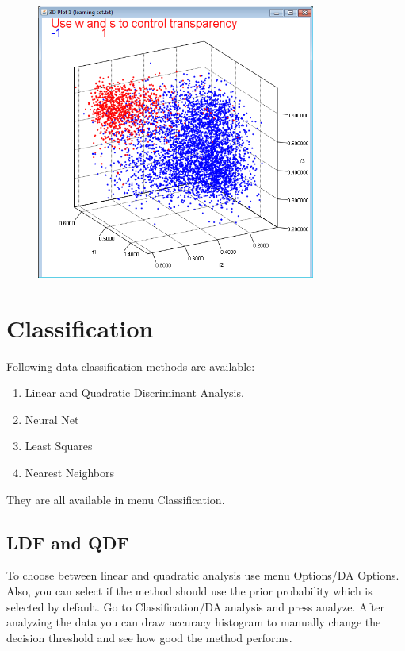 \documentclass[a4paper,12pt,english]{report}
\begin{document}
\begin{figure}[htb]
\centering
\includegraphics[width=260pt]{s10.png}
\end{figure}

\newpage

\section*{Classification}
Following data classification methods are available:
\begin{enumerate}
\item	Linear and Quadratic Discriminant Analysis.
\item Neural Net 
\item Least Squares 
\item Nearest Neighbors
\end{enumerate}
They are all available in menu Classification. 
\subsection*{LDF and QDF}
To choose between linear and quadratic analysis use menu Options/DA Options. Also, you can select if the method should use the prior probability which is selected by default. Go to Classification/DA analysis and press analyze. After analyzing the data you can draw accuracy histogram to manually change the decision threshold and see how good the method performs. 
 
\end{document}
